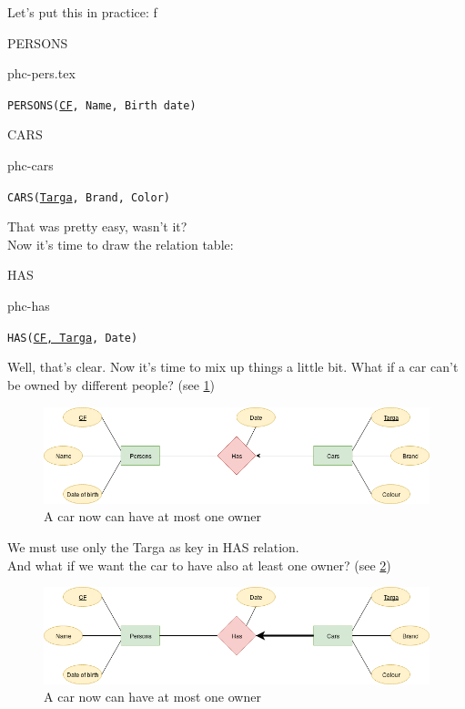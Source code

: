 \documentclass[class=book, crop=false, oneside]{standalone}
\begin{document}
Let's put this in practice:
\vskip 20pt
f
\begin{minipage}{0.45\textwidth}
	PERSONS
	\begin{table}[H]
		\centering
		{phc-pers.tex}
	\end{table}
	\texttt{PERSONS(\underline{CF}, Name, Birth date)}
\end{minipage}
\hspace{.1\textwidth}
\begin{minipage}{.45\textwidth}
	CARS
	\begin{table}[H]
		\centering
		{phc-cars}
	\end{table}
	\texttt{CARS(\underline{Targa}, Brand, Color)}
\end{minipage}
\vskip 20pt
That was pretty easy, wasn't it?\\
Now it's time to draw the relation table:
\vskip 20pt
\begin{minipage}{.7\textwidth}
	HAS
	\begin{table}[H]
		{phc-has}
	\end{table}
	\texttt{HAS(\underline{CF, Targa}, Date)}
\end{minipage}
\vskip 20pt
Well, that's clear. Now it's time to mix up things a little bit.
What if a car can't be owned by different people? (see \ref{diagram1_01})
\begin{figure}[H]
	\centering
	\includegraphics[width=\textwidth,keepaspectratio]{diagram1_01.png}
	\caption{A car now can have at most one owner}
	\label{diagram1_01}
\end{figure}
We must use only the Targa as key in HAS relation.
\\
And what if we want the car to have also at least one owner? (see \ref{diagram1_02})
\begin{figure}[H]
	\centering
	\includegraphics[width=\textwidth,keepaspectratio]{diagram1_02.png}
	\caption{A car now can have at most one owner}
	\label{diagram1_02}
\end{figure}
\end{document}

